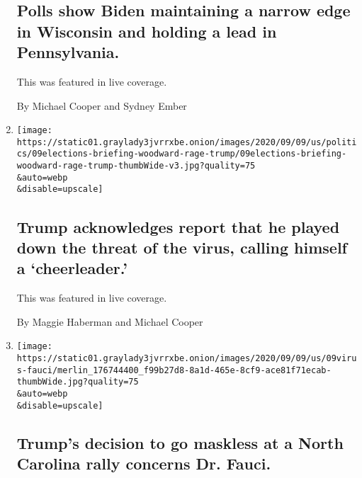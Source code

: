 \begin{enumerate}
  \hypertarget{polls-show-biden-maintaining-a-narrow-edge-in-wisconsin-and-holding-a-lead-in-pennsylvania}{%
  \subsection{Polls show Biden maintaining a narrow edge in Wisconsin
  and holding a lead in
  Pennsylvania.}\label{polls-show-biden-maintaining-a-narrow-edge-in-wisconsin-and-holding-a-lead-in-pennsylvania}}

  This was featured in live coverage.

  By Michael Cooper and Sydney Ember
\item
  \href{/live/2020/09/09/us/trump-vs-biden/trump-acknowledges-report-that-he-played-down-the-threat-of-the-virus-calling-himself-a-cheerleader}{}

  \texttt{[image: https://static01.graylady3jvrrxbe.onion/images/2020/09/09/us/politics/09elections-briefing-woodward-rage-trump/09elections-briefing-woodward-rage-trump-thumbWide-v3.jpg?quality=75\\\&auto=webp\\\&disable=upscale]}

  \hypertarget{trump-acknowledges-report-that-he-played-down-the-threat-of-the-virus-calling-himself-a-cheerleader}{%
  \subsection{Trump acknowledges report that he played down the threat
  of the virus, calling himself a
  `cheerleader.'}\label{trump-acknowledges-report-that-he-played-down-the-threat-of-the-virus-calling-himself-a-cheerleader}}

  This was featured in live coverage.

  By Maggie Haberman and Michael Cooper
\item
  \href{/2020/09/09/us/elections/trumps-decision-to-go-maskless-at-a-north-carolina-rally-concerns-dr-fauci.html}{}

  \texttt{[image: https://static01.graylady3jvrrxbe.onion/images/2020/09/09/us/09virus-fauci/merlin\_176744400\_f99b27d8-8a1d-465e-8cf9-ace81f71ecab-thumbWide.jpg?quality=75\\\&auto=webp\\\&disable=upscale]}

  \hypertarget{trumps-decision-to-go-maskless-at-a-north-carolina-rally-concerns-dr-fauci}{%
  \subsection{Trump's decision to go maskless at a North Carolina rally
  concerns Dr.
  Fauci.}\label{trumps-decision-to-go-maskless-at-a-north-carolina-rally-concerns-dr-fauci}}


\end{enumerate}
